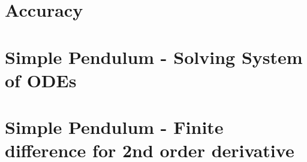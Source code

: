 \documentclass[
]{book}
\begin{document}
\hypertarget{accuracy-1}{%
\section{Accuracy}\label{accuracy-1}}

\hypertarget{simple-pendulum---solving-system-of-odes}{%
\section{Simple Pendulum - Solving System of ODEs}\label{simple-pendulum---solving-system-of-odes}}

\hypertarget{simple-pendulum---finite-difference-for-2nd-order-derivative}{%
\section{Simple Pendulum - Finite difference for 2nd order derivative}\label{simple-pendulum---finite-difference-for-2nd-order-derivative}}

  
\end{document}
